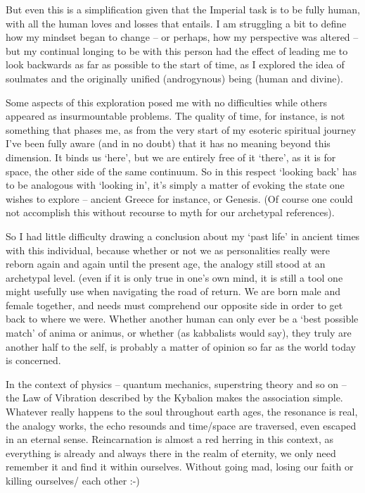 \begin{footnotesize}
\begin{sffamily}
But even this is a simplification given that the Imperial task is to be fully human, with all the human loves and losses that entails. I am struggling a bit to define how my mindset began to change -- or perhaps, how my perspective was altered -- but my continual longing to be with this person had the effect of leading me to look backwards as far as possible to the start of time, as I explored the idea of soulmates and the originally unified (androgynous) being (human and divine).

Some aspects of this exploration posed me with no difficulties while others appeared as insurmountable problems. The quality of time, for instance, is not something that phases me, as from the very start of my esoteric spiritual journey I've been fully aware (and in no doubt) that it has no meaning beyond this dimension. It binds us `here', but we are entirely free of it `there', as it is for space, the other side of the same continuum. So in this respect `looking back' has to be analogous with `looking in', it's simply a matter of evoking the state one wishes to explore -- ancient Greece for instance, or Genesis. (Of course one could not accomplish this without recourse to myth for our archetypal references).

So I had little difficulty drawing a conclusion about my `past life' in ancient times with this individual, because whether or not we as personalities really were reborn again and again until the present age, the analogy still stood at an archetypal level. (even if it is only true in one's own mind, it is still a tool one might usefully use when navigating the road of return. We are born male and female together, and needs must comprehend our opposite side in order to get back to where we were. Whether another human can only ever be a `best possible match' of anima or animus, or whether (as kabbalists would say), they truly are another half to the self, is probably a matter of opinion so far as the world today is concerned.

In the context of physics -- quantum mechanics, superstring theory and so on -- the Law of Vibration described by the Kybalion makes the association simple. Whatever really happens to the soul throughout earth ages, the resonance is real, the analogy works, the echo resounds and time/space are traversed, even escaped in an eternal sense. Reincarnation is almost a red herring in this context, as everything is already and always there in the realm of eternity, we only need remember it and find it within ourselves. Without going mad, losing our faith or killing ourselves/ each other :-)


\end{sffamily}
\end{footnotesize}

